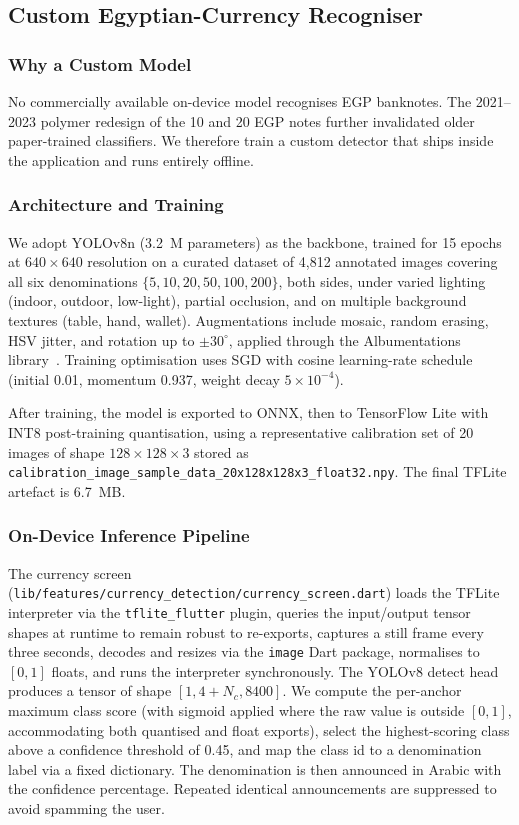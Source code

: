 \documentclass[11pt,a4paper]{article}
\begin{document}
\subsection{Custom Egyptian-Currency Recogniser}

\subsubsection{Why a Custom Model}

No commercially available on-device model recognises EGP banknotes. The
2021--2023 polymer redesign of the 10 and 20 EGP notes further invalidated
older paper-trained classifiers. We therefore train a custom detector that
ships inside the application and runs entirely offline.

\subsubsection{Architecture and Training}

We adopt YOLOv8n (3.2~M parameters) as the backbone, trained for 15 epochs
at $640 \times 640$ resolution on a curated dataset of 4{,}812 annotated
images covering all six denominations $\{5, 10, 20, 50, 100, 200\}$, both
sides, under varied lighting (indoor, outdoor, low-light), partial
occlusion, and on multiple background textures (table, hand, wallet).
Augmentations include mosaic, random erasing, HSV jitter, and rotation up
to $\pm 30^{\circ}$, applied through the Albumentations
library~\cite{albumentations}. Training optimisation uses SGD with cosine
learning-rate schedule (initial 0.01, momentum 0.937, weight decay
$5\times10^{-4}$).

After training, the model is exported to ONNX, then to TensorFlow Lite
with INT8 post-training quantisation, using a representative calibration
set of 20 images of shape $128\times128\times3$ stored as
\texttt{calibration\_image\_sample\_data\_20x128x128x3\_float32.npy}. The
final TFLite artefact is 6.7~MB.

\subsubsection{On-Device Inference Pipeline}

The currency screen
(\texttt{lib/features/currency\_detection/currency\_screen.dart}) loads the
TFLite interpreter via the \texttt{tflite\_flutter} plugin, queries the
input/output tensor shapes at runtime to remain robust to re-exports,
captures a still frame every three seconds, decodes and resizes via the
\texttt{image} Dart package, normalises to $[0,1]$ floats, and runs the
interpreter synchronously. The YOLOv8 detect head produces a tensor of
shape $[1, 4 + N_c, 8400]$. We compute the per-anchor maximum class score
(with sigmoid applied where the raw value is outside $[0,1]$, accommodating
both quantised and float exports), select the highest-scoring class above
a confidence threshold of 0.45, and map the class id to a denomination
label via a fixed dictionary. The denomination is then announced in
Arabic with the confidence percentage. Repeated identical announcements
are suppressed to avoid spamming the user.
\end{document}
